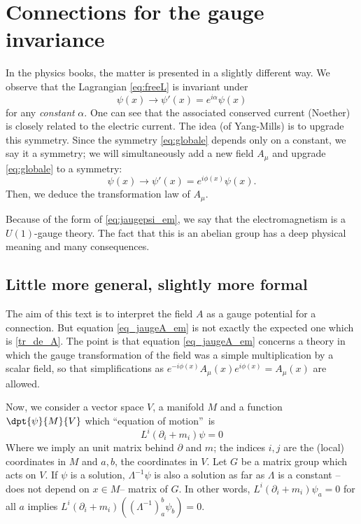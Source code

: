 \section{Connections for the gauge invariance}

In the physics books, the matter is presented in a slightly different way. We observe that the Lagrangian \eqref{eq:freeL} is invariant under
\begin{equation}\label{eq:globale}
\psi(x)\rightarrow\psi'(x)=e^{i\alpha}\psi(x)
\end{equation}
for any \emph{constant} $\alpha$. One can see that the associated conserved current (Noether) is closely related to the electric current. The idea (of Yang-Mills) is to upgrade this symmetry. Since the symmetry \eqref{eq:globale} depends only on a constant, we say it a  symmetry; we will simultaneously add a new field $A_{\mu}$ and upgrade \eqref{eq:globale} to a  symmetry:
 \begin{equation}\label{eq:locate}
\psi(x)\rightarrow\psi'(x)=e^{i\phi(x)}\psi(x).
\end{equation}
Then, we deduce the transformation law of $A_{\mu}$.

Because of the form of \eqref{eq:jaugepsi_em}, we say that the electromagnetism is a $U(1)$-gauge theory. The fact that this is an abelian group has a deep physical meaning and many consequences.


\subsection{Little more general, slightly more formal}

The aim of this text is to interpret the field $A$ as a gauge potential for a connection. But equation \eqref{eq_jaugeA_em} is not exactly the expected one which is \eqref{tr_de_A}. The point is that equation \eqref{eq_jaugeA_em} concerns a theory in which the gauge transformation of the field was a simple multiplication by a scalar field, so that simplifications as $e^{-i\phi(x)}A_{\mu}(x)e^{i\phi(x)}=A_{\mu}(x)$ are allowed.

Now, we consider a vector space $V$, a manifold $M$ and a function $\dpt{\psi}{M}{V}$ which ``equation of motion''\ is
\[
   L^i(\partial_i+m_i)\psi=0
\]
Where we imply an unit matrix behind $\partial$ and $m$; the indices $i,j$ are the (local) coordinates in $M$ and $a,b$, the coordinates in $V$. Let $G$ be a matrix group which acts on $V$. If $\psi$ is a solution, $\Lambda^{-1}\psi$ is also a solution as far as $\Lambda$ is a constant --does not depend on $x\in M$-- matrix of $G$. In other words, $L^i(\partial_i+m_i)\psi_a=0$ for all $a$ implies $L^i(\partial_i+m_i)((\Lambda^{-1})^b_a\psi_b)=0$.


